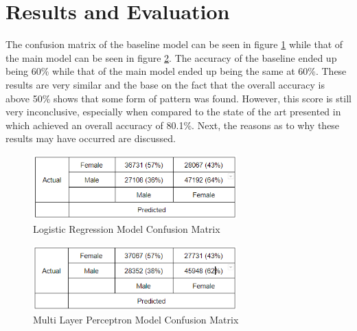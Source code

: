 \section{Results and Evaluation}
The confusion matrix of the baseline model can be seen in figure \ref{fig:baseline} while that of the main model can be seen in figure \ref{fig:main}. The accuracy of the baseline ended up being 60\% while that of the main model ended up being the same at 60\%. These results are very similar and the base on the fact that the overall accuracy is above 50\% shows that some form of pattern was found. However, this score is still very inconclusive, especially when compared to the state of the art presented in \cite{2} which achieved an overall accuracy of 80.1\%. Next, the reasons as to why these results may have occurred are discussed.

\begin{figure} \label{fig:baseline}
	\centering
	\includegraphics[width=0.7\textwidth]{Images/LR-CM.png}
	\caption{Logistic Regression Model Confusion Matrix}
\end{figure}

\begin{figure} \label{fig:main}
	\centering
	\includegraphics[width=0.7\textwidth]{Images/MLP-CM.png}
	\caption{Multi Layer Perceptron Model Confusion Matrix}
\end{figure}

